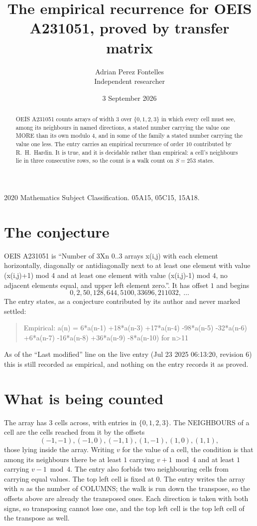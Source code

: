 \documentclass[11pt,a4paper]{article}
\title{The empirical recurrence for OEIS A231051, proved by transfer matrix}
\author{Adrian Perez Fontelles\\ \small Independent researcher}
\date{3 September 2026}
\theoremstyle{plain}
\theoremstyle{definition}
\begin{document}
\maketitle

\begin{abstract}
OEIS A231051 counts arrays of width $3$ over $\{0,1,2,3\}$ in which every cell must see, among its
neighbours in named directions, a stated number carrying the value one MORE than its own
modulo $4$, and in some of the family a stated number carrying the value one less. The entry
carries an empirical recurrence of order $10$ contributed by R.~H.~Hardin. It is true, and
it is decidable rather than empirical: a cell's neighbours lie in three consecutive rows, so
the count is a walk count on $S=253$ states.
\end{abstract}

\noindent\small 2020 Mathematics Subject Classification. 05A15, 05C15, 15A18.\normalsize

\section{The conjecture}

OEIS A231051 is ``Number of 3Xn 0..3 arrays x(i,j) with each element horizontally, diagonally or antidiagonally next to at least one element with value (x(i,j)+1) mod 4 and at least one element with value (x(i,j)-1) mod 4, no adjacent elements equal, and upper left element zero.''. It has offset $1$ and begins
\[
0, 2, 50, 128, 644, 5100, 33696, 211032,\ \dots
\]
The entry states, as a conjecture contributed by its author and never marked settled:
\begin{quote}
Empirical: a(n) = 6*a(n-1) +18*a(n-3) +17*a(n-4) -98*a(n-5) -32*a(n-6) +6*a(n-7) -16*a(n-8) +36*a(n-9) -8*a(n-10) for n>11
\end{quote}
As of the ``Last modified'' line on the live entry (Jul 23 2025 06:13:20, revision 6) this is still
recorded as empirical, and nothing on the entry records it as proved.

\section{What is being counted}

The array has $3$ cells across, with entries in $\{0,1,2,3\}$. The NEIGHBOURS of a cell are the
cells reached from it by the offsets
\[
(-1,-1), (-1,0), (-1,1), (1,-1), (1,0), (1,1),
\]
those lying inside the array. Writing $v$ for the value of a cell, the condition is that among
its neighbours there be at least $1$ carrying $v+1 \bmod 4$ and at least $1$ carrying $v-1 \bmod 4$. The entry also forbids two neighbouring cells from carrying equal values. The top left
cell is fixed at $0$. The entry writes the array with $n$ as the number of COLUMNS; the walk is run down the transpose, so the offsets above are already the transposed ones. Each direction is taken with both signs, so transposing cannot lose one, and the top left cell is the top left cell of the transpose as well.
\end{document}
